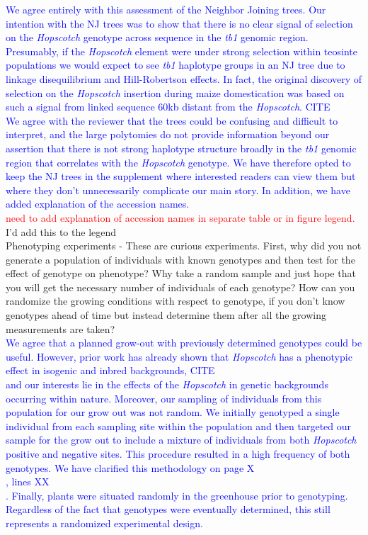 \documentclass[11pt]{article}
\newcommand{\res}[1]{\noindent \textcolor{blue}{{#1}} \\}
\newcommand{\jri}[1]{\noindent \textcolor{red}{{#1}} \\}
\newcommand{\mbh}[1]{\noindent \textcolor{Dandelion}{{#1}}\\}
\begin{document}
\res{We agree entirely with this assessment of the Neighbor Joining trees. 
Our intention with the NJ trees was to show that there is no clear signal of selection on the \emph{Hopscotch} genotype across sequence in the \emph{tb1} genomic region.
Presumably, if the \emph{Hopscotch} element were under strong selection within teosinte populations we would expect to see \emph{tb1} haplotype groups in an NJ tree due to linkage disequilibrium and Hill-Robertson effects.
In fact, the original discovery of selection on the \emph{Hopscotch} insertion during maize domestication was based on such a signal from linked sequence 60kb distant from the \emph{Hopscotch}. \mbh{CITE} 
We agree with the reviewer that the trees could be confusing and difficult to interpret, and the large polytomies do not provide information beyond our assertion that there is not strong haplotype structure broadly in the \emph{tb1} genomic region that correlates with the \emph{Hopscotch} genotype.
We have therefore opted to keep the NJ trees in the supplement where interested readers can view them but where they don't unnecessarily complicate our main story.
In addition, we have added explanation of the accession names.}

\jri{need to add explanation of accession names in separate table or in figure legend.} \mbh{I'd add this to the legend}

Phenotyping experiments - These are curious experiments.  First, why did you not generate a population of individuals with known genotypes and then test for the effect of genotype on phenotype?  Why take a random sample and just hope that you will get the necessary number of individuals of each genotype?  How can you randomize the growing conditions with respect to genotype, if you don't know genotypes ahead of time but instead determine them after all the growing measurements are taken?\\

\res{We agree that a planned grow-out with previously determined genotypes could be useful.  
However, prior work has already shown that \emph{Hopscotch} has a phenotypic effect in isogenic and inbred backgrounds, \mbh{CITE} and our interests lie in the effects of the \emph{Hopscotch} in genetic backgrounds occurring within nature.
Moreover, our sampling of individuals from this population for our grow out was not random.  
We initially genotyped a single individual from each sampling site within the population and then targeted our sample for the grow out to include a mixture of individuals from both \emph{Hopscotch} positive and negative sites.  
This procedure resulted in a high frequency of both genotypes.
We have clarified this methodology on page \mbh{X}, lines \mbh{XX}.
Finally, plants were situated randomly in the greenhouse prior to genotyping.
Regardless of the fact that genotypes were eventually determined, this still represents a randomized experimental design.}
\end{document}
